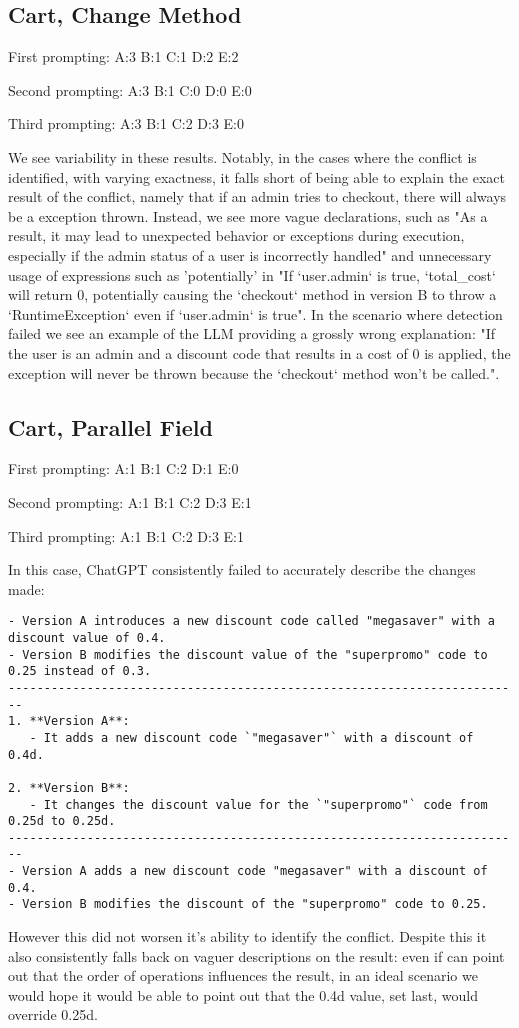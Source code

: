 \subsection{Cart, Change Method}

First prompting:
A:3
B:1
C:1
D:2
E:2

Second prompting:
A:3
B:1
C:0
D:0
E:0

Third prompting:
A:3
B:1
C:2
D:3
E:0

We see variability in these results. Notably, in the cases where the conflict is identified, with varying exactness, it falls short of being able to explain the exact result of the conflict, namely that if an admin tries to checkout, there will always be a exception thrown. Instead, we see more vague declarations, such as "As a result, it may lead to unexpected behavior or exceptions during execution, especially if the admin status of a user is incorrectly handled" and unnecessary usage of expressions such as 'potentially' in "If `user.admin` is true, `total\_cost` will return 0, potentially causing the `checkout` method in version B to throw a `RuntimeException` even if `user.admin` is true".
In the scenario where detection failed we see an example of the LLM providing a grossly wrong explanation: "If the user is an admin and a discount code that results in a cost of 0 is applied, the exception will never be thrown because the `checkout` method won't be called.".
\subsection{Cart, Parallel Field}

First prompting:
A:1
B:1
C:2
D:1
E:0

Second prompting:
A:1
B:1
C:2
D:3
E:1

Third prompting:
A:1
B:1
C:2
D:3
E:1

In this case, ChatGPT consistently failed to accurately describe the changes made:
\begin{lstlisting}
- Version A introduces a new discount code called "megasaver" with a discount value of 0.4.
- Version B modifies the discount value of the "superpromo" code to 0.25 instead of 0.3.
------------------------------------------------------------------------
1. **Version A**:
   - It adds a new discount code `"megasaver"` with a discount of 0.4d.

2. **Version B**:
   - It changes the discount value for the `"superpromo"` code from 0.25d to 0.25d.
------------------------------------------------------------------------
- Version A adds a new discount code "megasaver" with a discount of 0.4.
- Version B modifies the discount of the "superpromo" code to 0.25.
\end{lstlisting}
However this did not worsen it's ability to identify the conflict. Despite this it also consistently falls back on vaguer descriptions on the result: even if can point out that the order of operations influences the result, in an ideal scenario we would hope it would be able to point out that the 0.4d value, set last, would override 0.25d.


